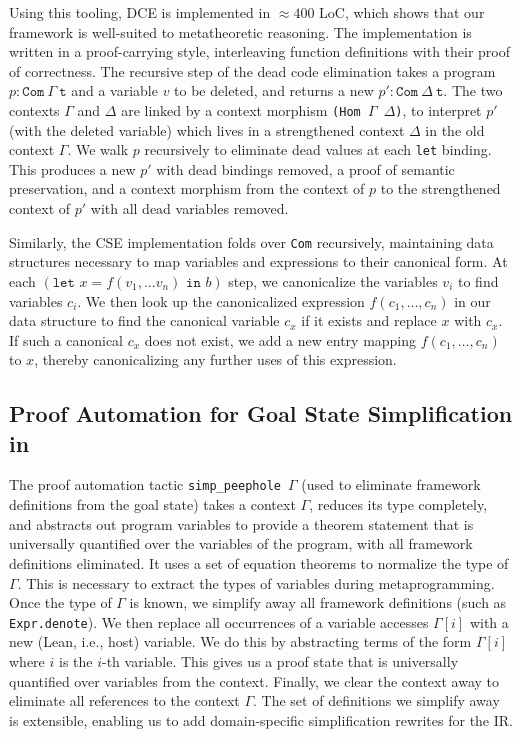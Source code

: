 Using this tooling, DCE is implemented in $\approx 400$ LoC, which shows that our framework is well-suited to metatheoretic reasoning.
The implementation is written in a proof-carrying style, interleaving function definitions with their proof of correctness.
The recursive step of the dead code elimination takes a program $p : \texttt{Com}~\Gamma~\texttt{t}$ and a variable $v$ to be deleted, and returns a new $p': \texttt{Com}~\Delta~\texttt{t}$.
The two contexts $\Gamma$ and $\Delta$ are linked by a context morphism \texttt{(Hom $\Gamma$ $\Delta$)}, to interpret $p'$ (with the deleted variable) which lives in a strengthened context $\Delta$ in the old context $\Gamma$.
We walk $p$ recursively to eliminate dead values at each \texttt{let} binding.
This produces a new $p'$ with dead bindings removed, a proof of semantic preservation, and a context morphism from the context of $p$ to the strengthened context of $p'$ with all dead variables removed.

Similarly, the CSE implementation folds over \texttt{Com} recursively, maintaining data structures necessary to map variables and expressions to their canonical form.
At each $(\texttt{let }x = f(v_1, ... v_n)\texttt{ in }b)$ step, we canonicalize the variables $v_i$ to find variables $c_i$.
We then look up the canonicalized expression $f(c_1, \dots, c_n)$ in our data structure to find the canonical variable $c_x$ if it exists and replace $x$ with $c_x$.
If such a canonical $c_x$ does not exist, we add a new entry mapping $f(c_1, \dots, c_n)$ to $x$, thereby canonicalizing any further uses of this expression.

\subsection{Proof Automation for Goal State Simplification in \texorpdfstring{}{LeanMLIR(X)}}
\label{sec:mlir:automation}

The proof automation tactic \texttt{simp\_peephole}~$\Gamma$ (used to eliminate framework definitions from the goal state) takes a context $\Gamma$, reduces its type completely, and abstracts out program variables to provide a theorem statement that is universally quantified over the variables of the program, with all framework definitions eliminated.
It uses a set of equation theorems to normalize the type of $\Gamma$.
This is necessary to extract the types of variables during metaprogramming.
Once the type of $\Gamma$ is known, we simplify away all framework definitions (such as \texttt{Expr.denote}).
We then replace all occurrences of a variable accesses $\Gamma[i]$ with a new (Lean, i.e., host) variable.
We do this by abstracting terms of the form $\Gamma[i]$ where $i$ is the $i$-th variable.
This gives us a proof state that is universally quantified over variables from the context.
Finally, we clear the context away to eliminate all references to the context $\Gamma$.
The set of definitions we simplify away is extensible, enabling us to add domain-specific simplification rewrites for the IR.

